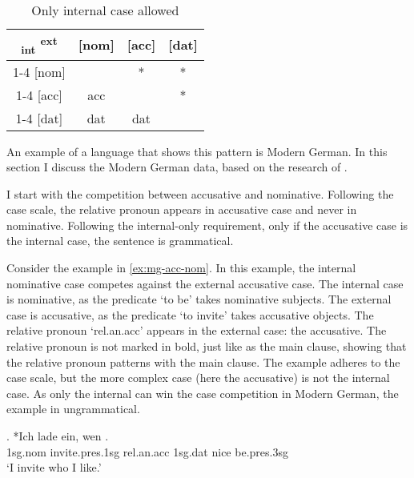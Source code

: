 \begin{table}[H]
  \center
  \caption{Only internal case allowed}
  \begin{tabular}{c|c|c|c}
    \toprule
    \textsubscript{\ac{int}} \textsuperscript{\ac{ext}}
           & [\ac{nom}]
           & [\ac{acc}]
           & [\ac{dat}]
           \\ \cmidrule{1-4}
       [\ac{nom}]
           &
           & *
           & *
           \\ \cmidrule{1-4}
       [\ac{acc}]
           & \ac{acc}
           &
           & *
           \\ \cmidrule{1-4}
       [\ac{dat}]
           & \ac{dat}
           & \ac{dat}
           &
           \\
     \bottomrule
  \end{tabular}
    \label{tbl:case-competition-only-int-repeated}
\end{table}

An example of a language that shows this pattern is Modern German. In this section I discuss the Modern German data, based on the research of \citet{vogel2001}.

I start with the competition between accusative and nominative. Following the case scale, the relative pronoun appears in accusative case and never in nominative. Following the internal-only requirement, only if the accusative case is the internal case, the sentence is grammatical.

Consider the example in \ref{ex:mg-acc-nom}. In this example, the internal nominative case competes against the external accusative case.
The internal case is nominative, as the predicate  `to be' takes nominative subjects.
The external case is accusative, as the predicate  `to invite' takes accusative objects.
The relative pronoun  `\ac{rel}.\ac{an}.\ac{acc}' appears in the external case: the accusative. The relative pronoun is not marked in bold, just like as the main clause, showing that the relative pronoun patterns with the main clause.
The example adheres to the case scale, but the more complex case (here the accusative) is not the internal case. As only the internal can win the case competition in Modern German, the example in ungrammatical.

\exg. *Ich {lade ein}, wen   .\\
 1\ac{sg}.\ac{nom} invite.\ac{pres}.1\ac{sg}\scsub{[acc]} \ac{rel}.\ac{an}.\ac{acc} 1\ac{sg}.\ac{dat} nice be.\ac{pres}.3\ac{sg}\scsub{[nom]}\\
 `I invite who I like.' \label{ex:mg-acc-nom}

